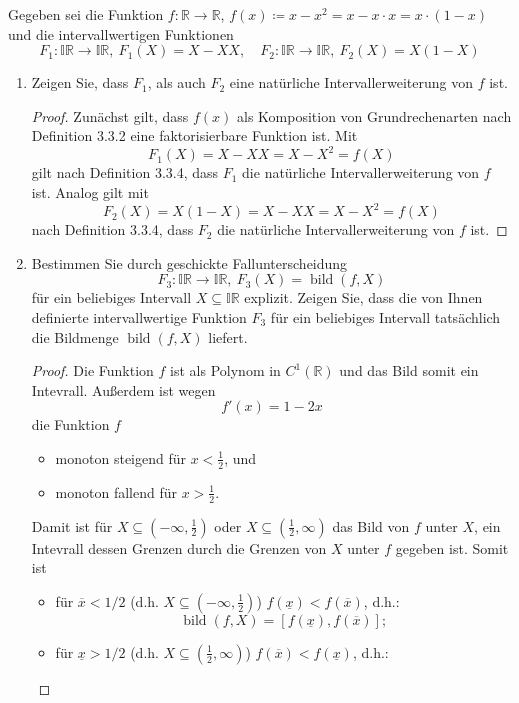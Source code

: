 \documentclass[12pt]{extreport} %
\newcommand{\R}{\mathbb{R}}
\begin{document}
Gegeben sei die Funktion $f \colon \R \rightarrow \R$, $f(x) \coloneqq x - x^2 = x - x \cdot x = x \cdot \left( 1 - x \right)$ und die intervallwertigen Funktionen
	$$ F_1 \colon \mathbb{IR} \rightarrow \mathbb{IR}, ~ F_1(X) = X - X X, \quad F_2 \colon \mathbb{IR} \rightarrow \mathbb{IR}, ~ F_2(X) = X(1- X) $$
\begin{enumerate}
	\item Zeigen Sie, dass $F_1$, als auch $F_2$ eine natürliche Intervallerweiterung von $f$ ist.
		\begin{proof} 
			Zunächst gilt, dass $f(x)$ als Komposition von Grundrechenarten nach Definition 3.3.2 eine faktorisierbare Funktion ist. Mit 
			$$ F_1(X) = X-XX = X-X^2 = f(X) $$
			gilt nach Definition 3.3.4, dass $F_1$ die natürliche Intervallerweiterung von $f$ ist. Analog gilt mit 
			$$ F_2(X)=X(1-X)=X-XX=X-X^2=f(X) $$
			nach Definition 3.3.4, dass $F_2$ die natürliche Intervallerweiterung von $f$ ist.
		\end{proof}
	\item Bestimmen Sie durch geschickte Fallunterscheidung
		$$ F_3 \colon \mathbb{IR} \rightarrow \mathbb{IR}, ~ F_3(X) = \operatorname{bild}(f, X) $$
		für ein beliebiges Intervall $X \subseteq \mathbb{IR}$ explizit. Zeigen Sie, dass die von Ihnen definierte intervallwertige Funktion $F_3$ für ein beliebiges Intervall tatsächlich die Bildmenge $\operatorname{bild}(f, X)$ liefert.
		\begin{proof}
			Die Funktion $f$ ist als Polynom in $C^1(\R)$ und das Bild somit ein  Intevrall. Außerdem ist wegen 
				$$ f'(x) = 1 - 2x $$ 
			die Funktion $f$ 
			\begin{itemize}
				\item monoton steigend für $x < \frac{1}{2}$, und
				\item monoton fallend für $x > \frac{1}{2}$.
			\end{itemize}
			Damit ist für $X \subseteq \left(-\infty, \frac{1}{2} \right)$ oder $X \subseteq \left(\frac{1}{2}, \infty \right)$ das Bild von $f$ unter $X$, ein Intevrall dessen Grenzen durch die Grenzen von $X$ unter $f$ gegeben ist. Somit ist
			\begin{itemize}
				\item für $\overline{x} < 1/2$ (d.h. $X \subseteq \left(-\infty, \frac{1}{2} \right)$) $f(\underline{x}) < f(\overline{x})$, d.h.:
					$$ \operatorname{bild}(f,X) = \left[f(\underline{x}), f(\overline{x}) \right]; $$
				\item für $\underline{x} >1/2$ (d.h. $X \subseteq \left(\frac{1}{2}, \infty \right)$) $f(\overline{x}) < f(\underline{x})$, d.h.:

\end{itemize}
\end{proof}
\end{enumerate}
\end{document}
